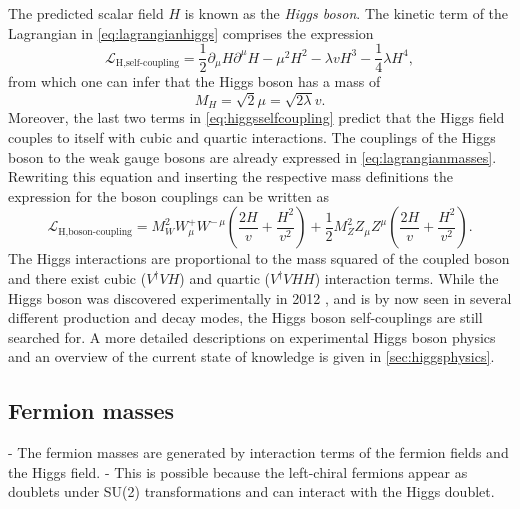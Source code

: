 The predicted scalar field $H$ is known as the \emph{Higgs boson}.
The kinetic term of the Lagrangian in \cref{eq:lagrangianhiggs} comprises the expression
\begin{equation}
  \mathcal{L}_{\text{H,self-coupling}} = \frac{1}{2}\partial_\mu H \partial^\mu H - \mu^2 H^2 - \lambda v H^3 - \frac{1}{4} \lambda H^4,
  \label{eq:higgsselfcoupling}
\end{equation}
from which one can infer that the Higgs boson has a mass of
\begin{equation}
  M_H = \sqrt{2} \mu = \sqrt{2 \lambda} v.
\end{equation}
Moreover, the last two terms in \cref{eq:higgsselfcoupling} predict that the Higgs field couples to itself with cubic and quartic interactions.
The couplings of the Higgs boson to the weak gauge bosons are already expressed in \cref{eq:lagrangianmasses}. Rewriting this equation and inserting the respective mass definitions the expression for the boson couplings can be written as
\begin{equation}
  \mathcal{L}_{\text{H,boson-coupling}} = M_W^2 W_\mu^+W^{-\,\mu} \left( \frac{2H}{v} + \frac{H^2}{v^2} \right) + \frac{1}{2} M_Z^2 Z_\mu Z^\mu \left( \frac{2H}{v} + \frac{H^2}{v^2} \right).
  \label{eq:higgsbosoncoupling}
\end{equation}
The Higgs interactions are proportional to the mass squared of the coupled boson and there exist cubic ($V^\dagger VH$) and quartic ($V^\dagger VHH$) interaction terms.
While the Higgs boson was discovered experimentally in 2012 \cite{Aad:2012tfa,Chatrchyan:2012xdj}, and is by now seen in several different production and decay modes, the Higgs boson self-couplings are still searched for.
A more detailed descriptions on experimental Higgs boson physics and an overview of the current state of knowledge is given in \cref{sec:higgsphysics}.












\subsection{Fermion masses}
- The fermion masses are generated by interaction terms of the fermion fields and the Higgs field.
- This is possible because the left-chiral fermions appear as doublets under SU(2) transformations and can interact with the Higgs doublet.


